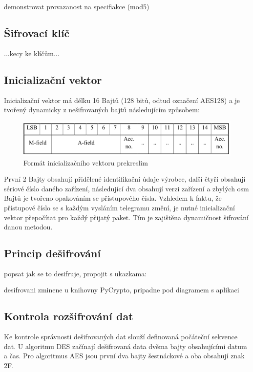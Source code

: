 \colorbox[rgb]{0,1,0}{demonstrovat provazanost na specifiakce (mod5)}

\subsection{Šifrovací klíč}
\colorbox[rgb]{0,1,0}{...kecy ke klíčům...}

\subsection{Inicializační vektor}
Inicializační vektor má délku 16 Bajtů (128 bitů, odtud označení AES128) a je tvořený dynamicky z nešifrovaných bajtů následujícím způsobem:
\begin{figure}[!h]
 \begin{center}
    \includegraphics[scale=0.9]{obrazky/sifrovani_vektor}
  \end{center}
  \caption{Formát inicializačního vektoru \colorbox[rgb]{0,1,0}{prekreslim}}
\end{figure}

První 2 Bajty obsahují přidělené identifikační údaje výrobce, další čtyři obsahují sériové číslo daného zařízení, následující dva obsahují verzi zařízení a zbylých osm Bajtů je tvořeno opakováním se přístupového čísla. Vzhledem k faktu, že přístupové číslo se s každým vysláním telegramu změní, je nutné inicializační vektor přepočítat pro každý přijatý paket. Tím je zajištěna dynamičnost šifrování danou metodou.

\subsection{Princip dešifrování}

\colorbox[rgb]{0,1,0}{popsat jak se to desifruje, propojit s ukazkama:}

 \colorbox[rgb]{0,1,0}{desifrovani zminene u knihovny PyCrypto, pripadne pod diagramem s aplikaci}


\subsection{Kontrola rozšifrování dat}
Ke kontrole správnosti dešifrovaných dat slouží definovaná počáteční sekvence dat. U algoritmu DES začínají dešifrovaná data dvěma bajty obsahujícími datum a čas. Pro algoritmus AES jsou první dva bajty šestnáckové a oba obsahují znak 2F.

